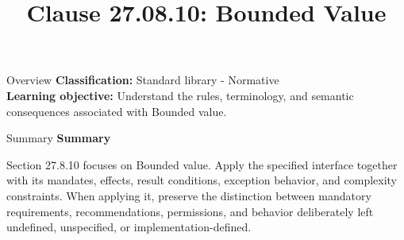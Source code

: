 \documentclass[10pt,letterpaper]{article}
\title{Clause 27.08.10: Bounded Value}
\author{}
\date{}
\begin{document}
\maketitle
\begin{CornellOverviewBox}{Overview}
\textbf{Classification:} Standard library - Normative\\[2pt]
\textbf{Learning objective:} Understand the rules, terminology, and semantic consequences associated with Bounded value.
\end{CornellOverviewBox}\begin{CornellSummaryBox}{Summary}
{\sffamily\bfseries\color{Accent} Summary}\par\vspace{3pt}Section 27.8.10 focuses on Bounded value. Apply the specified interface together with its mandates, effects, result conditions, exception behavior, and complexity constraints. When applying it, preserve the distinction between mandatory requirements, recommendations, permissions, and behavior deliberately left undefined, unspecified, or implementation-defined.
\end{CornellSummaryBox}
\end{document}
